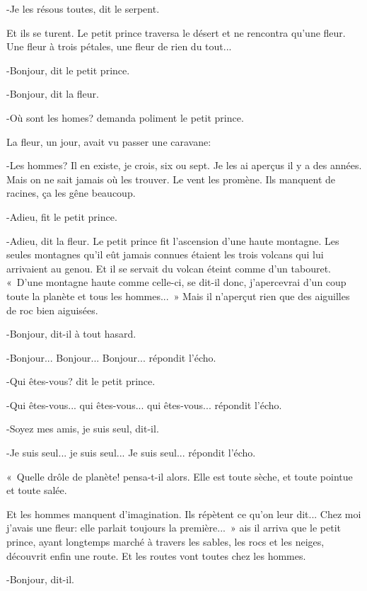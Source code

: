 \documentclass{report}
\begin{document}
-Je les résous toutes, dit le serpent.

Et ils se turent.
\parachapter{} %
Le petit prince traversa le désert et ne rencontra qu'une fleur. Une fleur à trois pétales, une fleur de rien du tout...


-Bonjour, dit le petit prince.

-Bonjour, dit la fleur.

-Où sont les homes? demanda poliment le petit prince.

La fleur, un jour, avait vu passer une caravane:

-Les hommes? Il en existe, je crois, six ou sept. Je les ai aperçus il y a des années. Mais on ne sait jamais où les trouver. Le vent les promène. Ils manquent de racines, ça les gêne beaucoup.

-Adieu, fit le petit prince.

-Adieu, dit la fleur.
\parachapter{} %
Le petit prince fit l'ascension d'une haute montagne. Les seules montagnes qu'il eût jamais connues étaient les trois volcans qui lui arrivaient au genou. Et il se servait du volcan éteint comme d'un tabouret. «~D'une montagne haute comme celle-ci, se dit-il donc, j'apercevrai d'un coup toute la planète et tous les hommes...~» Mais il n'aperçut rien que des aiguilles de roc bien aiguisées.


-Bonjour, dit-il à tout hasard.

-Bonjour... Bonjour... Bonjour... répondit l'écho.

-Qui êtes-vous? dit le petit prince.

-Qui êtes-vous... qui êtes-vous... qui êtes-vous... répondit l'écho.

-Soyez mes amis, je suis seul, dit-il.

-Je suis seul... je suis seul... Je suis seul... répondit l'écho.

«~Quelle drôle de planète! pensa-t-il alors. Elle est toute sèche, et toute pointue et toute salée.

Et les hommes manquent d'imagination. Ils répètent ce qu'on leur dit... Chez moi j'avais une fleur: elle parlait toujours la première...~»
\parachapter{} %
ais il arriva que le petit prince, ayant longtemps marché à travers les sables, les rocs et les neiges, découvrit enfin une route. Et les routes vont toutes chez les hommes.

-Bonjour, dit-il.
\end{document}
